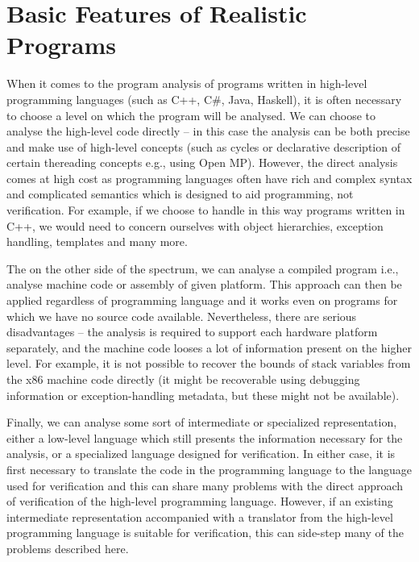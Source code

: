 \section{Basic Features of Realistic Programs}

When it comes to the program analysis of programs written in high-level programming languages (such as C++, C\#, Java, Haskell), it is often necessary to choose a level on which the program will be analysed.
We can choose to analyse the high-level code directly -- in this case the analysis can be both precise and make use of high-level concepts (such as cycles or declarative description of certain thereading concepts e.g., using Open MP\footnotemark{}).
However, the direct analysis comes at high cost as programming languages often have rich and complex syntax and complicated semantics which is designed to aid programming, not verification.
For example, if we choose to handle in this way programs written in C++, we would need to concern ourselves with object hierarchies, exception handling, templates and many more.

The on the other side of the spectrum, we can analyse a compiled program i.e., analyse machine code or assembly of given platform.
This approach can then be applied regardless of programming language and it works even on programs for which we have no source code available.
Nevertheless, there are serious disadvantages -- the analysis is required to support each hardware platform separately, and the machine code looses a lot of information present on the higher level.
For example, it is not possible to recover the bounds of stack variables from the x86 machine code directly (it might be recoverable using debugging information or exception-handling metadata, but these might not be available).

Finally, we can analyse some sort of intermediate or specialized representation, either a low-level language which still presents the information necessary for the analysis, or a specialized language designed for verification.
In either case, it is first necessary to translate the code in the programming language to the language used for verification and this can share many problems with the direct approach of verification of the high-level programming language.
However, if an existing intermediate representation accompanied with a translator from the high-level programming language is suitable for verification, this can side-step many of the problems described here.

